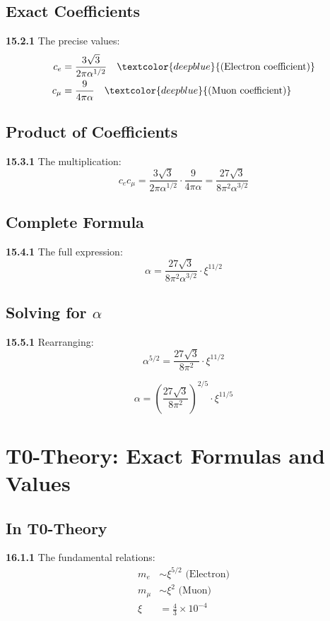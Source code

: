 \subsection{Exact Coefficients}

\noindent \textbf{15.2.1} The precise values:
\begin{align*}
	c_e &= \frac{3\sqrt{3}}{2\pi\alpha^{1/2}} \quad \textcolor{deepblue}{\text{(Electron coefficient)}} \\
	c_\mu &= \frac{9}{4\pi\alpha} \quad \textcolor{deepblue}{\text{(Muon coefficient)}}
\end{align*}

\subsection{Product of Coefficients}

\noindent \textbf{15.3.1} The multiplication:
\[
c_e c_\mu = \frac{3\sqrt{3}}{2\pi\alpha^{1/2}} \cdot \frac{9}{4\pi\alpha} = \frac{27\sqrt{3}}{8\pi^2\alpha^{3/2}}
\]

\subsection{Complete Formula}

\noindent \textbf{15.4.1} The full expression:
\[
\alpha = \frac{27\sqrt{3}}{8\pi^2\alpha^{3/2}} \cdot \xi^{11/2}
\]

\subsection{Solving for $\alpha$}

\noindent \textbf{15.5.1} Rearranging:
\[
\alpha^{5/2} = \frac{27\sqrt{3}}{8\pi^2} \cdot \xi^{11/2}
\]

\[
\alpha = \left(\frac{27\sqrt{3}}{8\pi^2}\right)^{2/5} \cdot \xi^{11/5}
\]


\section{T0-Theory: Exact Formulas and Values}

\subsection{In T0-Theory}

\noindent \textbf{16.1.1} The fundamental relations:
\begin{align}
	m_e &\sim \xi^{5/2} \text{ (Electron)} \\
	m_\mu &\sim \xi^2 \text{ (Muon)} \\
	\xi &= \frac{4}{3} \times 10^{-4} 
\end{align}

